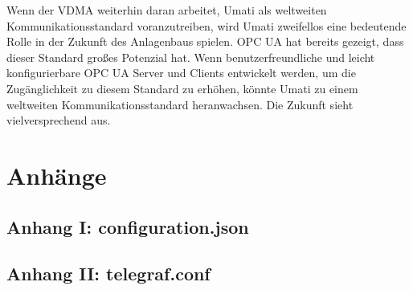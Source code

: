 \documentclass[a4paper, 12pt, oneside, toc=listofnumbered, bibliography=totoc]{scrbook}
\begin{document}
		Wenn der VDMA weiterhin daran arbeitet, Umati als weltweiten Kommunikationsstandard voranzutreiben, wird Umati zweifellos eine bedeutende Rolle in der Zukunft des Anlagenbaus spielen. OPC UA hat bereits gezeigt, dass dieser Standard großes Potenzial hat. Wenn benutzerfreundliche und leicht konfigurierbare OPC UA Server und Clients entwickelt werden, um die Zugänglichkeit zu diesem Standard zu erhöhen, könnte Umati zu einem weltweiten Kommunikationsstandard heranwachsen. Die Zukunft sieht vielversprechend aus.
	
	\printbibliography
	\frontmatter
	
	\pagebreak
	\chapter{Anhänge} %
	\section*{Anhang I: configuration.json}
	
	\pagebreak
	\section*{Anhang II: telegraf.conf}
	
	\pagebreak
\end{document}
